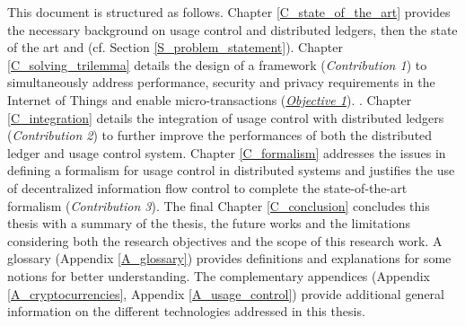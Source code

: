 This document is structured as follows. Chapter \ref{C_state_of_the_art} provides the necessary background on usage control and distributed ledgers, then the state of the art and  (cf. Section \ref{S_problem_statement}). Chapter \ref{C_solving_trilemma} details the design of a framework (\emph{Contribution 1}) to simultaneously address performance, security and privacy requirements in the Internet of Things and enable micro-transactions (\hyperref[obj:1]{\emph{Objective 1}}). . Chapter \ref{C_integration} details the integration of usage control with distributed ledgers (\emph{Contribution 2}) to further improve the performances of both the distributed ledger and usage control system. Chapter \ref{C_formalism} addresses the issues in defining a formalism for usage control in distributed systems and justifies the use of decentralized information flow control to complete the state-of-the-art formalism (\emph{Contribution 3}). The final Chapter \ref{C_conclusion} concludes this thesis with a summary of the thesis, the future works and the limitations considering both the research objectives and the scope of this research work.
A glossary (Appendix \ref{A_glossary}) provides definitions and explanations for some notions 
for better understanding.
The complementary appendices (Appendix \ref{A_cryptocurrencies}, Appendix \ref{A_usage_control}) provide additional general information on the different technologies 
addressed in this thesis.  